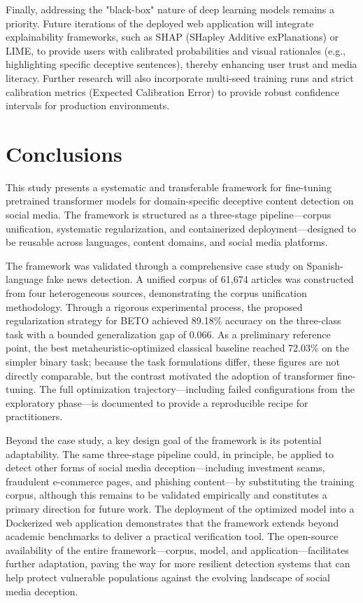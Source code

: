 \documentclass[informatics,article,submit,pdftex,moreauthors]{Definitions/mdpi}
\begin{document}
Finally, addressing the "black-box" nature of deep learning models remains a priority. Future iterations of the deployed web application will integrate explainability frameworks, such as SHAP (SHapley Additive exPlanations) or LIME, to provide users with calibrated probabilities and visual rationales (e.g., highlighting specific deceptive sentences), thereby enhancing user trust and media literacy. Further research will also incorporate multi-seed training runs and strict calibration metrics (Expected Calibration Error) to provide robust confidence intervals for production environments.

\section{Conclusions}
This study presents a systematic and transferable framework for fine-tuning pretrained transformer models for domain-specific deceptive content detection on social media. The framework is structured as a three-stage pipeline—corpus unification, systematic regularization, and containerized deployment—designed to be reusable across languages, content domains, and social media platforms.

The framework was validated through a comprehensive case study on Spanish-language fake news detection. A unified corpus of 61,674 articles was constructed from four heterogeneous sources, demonstrating the corpus unification methodology. Through a rigorous experimental process, the proposed regularization strategy for BETO achieved 89.18\% accuracy on the three-class task with a bounded generalization gap of 0.066. As a preliminary reference point, the best metaheuristic-optimized classical baseline reached 72.03\% on the simpler binary task; because the task formulations differ, these figures are not directly comparable, but the contrast motivated the adoption of transformer fine-tuning. The full optimization trajectory—including failed configurations from the exploratory phase—is documented to provide a reproducible recipe for practitioners.

Beyond the case study, a key design goal of the framework is its potential adaptability. The same three-stage pipeline could, in principle, be applied to detect other forms of social media deception—including investment scams, fraudulent e-commerce pages, and phishing content—by substituting the training corpus, although this remains to be validated empirically and constitutes a primary direction for future work. The deployment of the optimized model into a Dockerized web application demonstrates that the framework extends beyond academic benchmarks to deliver a practical verification tool. The open-source availability of the entire framework—corpus, model, and application—facilitates further adaptation, paving the way for more resilient detection systems that can help protect vulnerable populations against the evolving landscape of social media deception.
\end{document}
